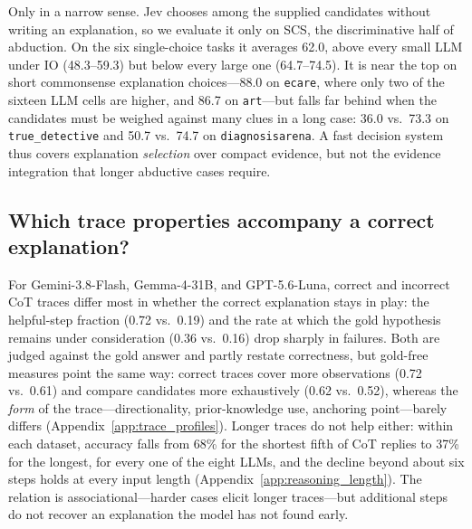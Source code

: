 Only in a narrow sense. Jev chooses among the supplied candidates without writing an explanation, so we evaluate it only on SCS, the discriminative half of abduction. On the six single-choice tasks it averages 62.0, above every small LLM under IO (48.3--59.3) but below every large one (64.7--74.5). It is near the top on short commonsense explanation choices---88.0 on \texttt{ecare}, where only two of the sixteen LLM cells are higher, and 86.7 on \texttt{art}---but falls far behind when the candidates must be weighed against many clues in a long case: 36.0 vs.\ 73.3 on \texttt{true\_detective} and 50.7 vs.\ 74.7 on \texttt{diagnosisarena}. A fast decision system thus covers explanation \emph{selection} over compact evidence, but not the evidence integration that longer abductive cases require.

\subsection{Which trace properties accompany a correct explanation?}
\label{sec:cognitive_profiles_and_quality_gap}
\label{sec:reasoning_length}

For Gemini-3.8-Flash, Gemma-4-31B, and GPT-5.6-Luna, correct and incorrect CoT traces differ most in whether the correct explanation stays in play: the helpful-step fraction (0.72 vs.\ 0.19) and the rate at which the gold hypothesis remains under consideration (0.36 vs.\ 0.16) drop sharply in failures. Both are judged against the gold answer and partly restate correctness, but gold-free measures point the same way: correct traces cover more observations (0.72 vs.\ 0.61) and compare candidates more exhaustively (0.62 vs.\ 0.52), whereas the \emph{form} of the trace---directionality, prior-knowledge use, anchoring point---barely differs (Appendix~\ref{app:trace_profiles}). Longer traces do not help either: within each dataset, accuracy falls from 68\% for the shortest fifth of CoT replies to 37\% for the longest, for every one of the eight LLMs, and the decline beyond about six steps holds at every input length (Appendix~\ref{app:reasoning_length}). The relation is associational---harder cases elicit longer traces---but additional steps do not recover an explanation the model has not found early.

